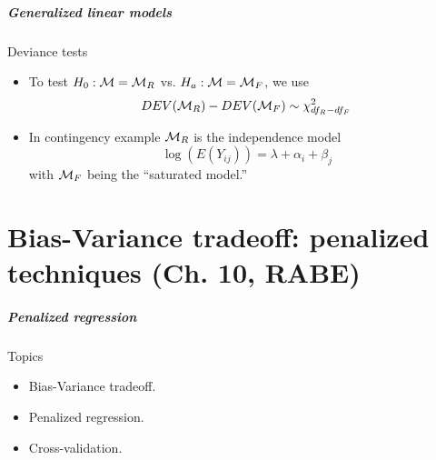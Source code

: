 \documentclass[handout]{beamer}
\begin{document}
   \begin{frame} \frametitle{Generalized linear models}

   \begin{block}
         {Deviance tests}
         \begin{itemize}
         \item To test $H_0:{\cal M}={\cal M}_R$ vs. $H_a: {\cal M}={\cal M}_F$,
   we use
   $$DEV({\cal M}_R) - DEV({\cal M}_F) \sim \chi^2_{df_R-df_F}$$

   \item In contingency example ${\cal M}_R$ is the independence model
   $$
   \log(E(Y_{ij})) = \lambda + \alpha_i  + \beta_j$$
   with ${\cal M}_F$ being the ``saturated model.''


         \end{itemize}
   \end{block}
   \end{frame}

   \part{Bias-Variance tradeoff: penalized techniques (Ch. 10, RABE)}
   \frame{\partpage}


   \begin{frame} \frametitle{Penalized regression}

   \begin{block} {Topics}
     \begin{itemize}

     \item Bias-Variance tradeoff.
   \item Penalized regression.
     \item Cross-validation.

   \end{itemize}

   \end{block}
   \end{frame}

\end{document}

